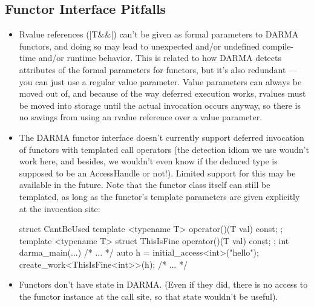 \subsection{Functor Interface Pitfalls}

\begin{itemize}
  \item Rvalue references (|T&&|) can't be given as formal parameters to DARMA
  functors, and doing so may lead to unexpected and/or undefined compile-time
  and/or runtime behavior.  This is related to how DARMA detects attributes of
  the formal parameters for functors, but it's also redundant --- you can just
  use a regular value parameter.  Value parameters can always be moved out of,
  and because of the way deferred execution works, rvalues must be moved into
  storage until the actual invocation occurs anyway, so there is no savings
  from using an rvalue reference over a value parameter.
  \item The DARMA functor interface doesn't currently support deferred
  invocation of functors with templated call operators (the detection idiom we
  use woudn't work here, and besides, we wouldn't even know if the deduced type
  is supposed to be an AccessHandle or not!).  Limited support for this may be
  available in the future.  Note that the functor class itself can still be
  templated, as long as the functor's template parameters are given explicitly
  at the invocation site:
\begin{CppCodeNumb}
struct CantBeUsed {
  template <typename T>
  operator()(T val) const;
};
template <typename T>
struct ThisIsFine {
  operator()(T val) const;
};
int darma_main(...) {
  /* ... */
  auto h = initial_access<int>("hello");
  create_work<ThisIsFine<int>>(h);
  /* ... */
}
\end{CppCodeNumb}
  \item Functors don't have state in DARMA.  (Even if they did, there is no
  access to the functor instance at the call site, so that state wouldn't be useful).
\end{itemize}

\lstDeleteShortInline{\|}